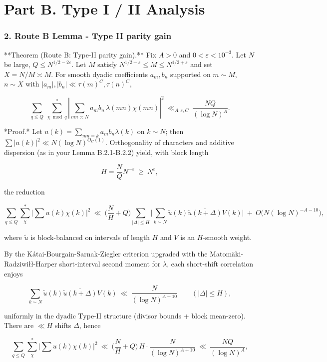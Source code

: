 \documentclass[11pt]{article}
\theoremstyle{definition}
\theoremstyle{remark}
\begin{document}
\part*{Part B. Type I / II Analysis}

\section*{2. Route B Lemma - Type II parity gain}

**Theorem (Route B: Type-II parity gain).**
Fix $A>0$ and $0<\varepsilon<10^{-3}$. Let $N$ be large, $Q\le N^{1/2-2\varepsilon}$. Let $M$ satisfy $N^{1/2-\varepsilon}\le M\le N^{1/2+\varepsilon}$ and set $X=N/M\asymp M$. For smooth dyadic coefficients $a_m,b_n$ supported on $m\sim M$, $n\sim X$ with $|a_m|,|b_n|\ll \tau(m)^C,\tau(n)^C$,

$$
	\sum_{q\le Q}\ \sum_{\chi\bmod q}^{\!*}
	\left|\sum_{mn\asymp N} a_m b_n\,\lambda(mn)\chi(mn)\right|^2
	\ \ll_{A,\varepsilon,C}\ \frac{NQ}{(\log N)^{A}}.
$$

*Proof.* Let $u(k)=\sum_{mn=k}a_m b_n \lambda(k)$ on $k\sim N$; then $\sum |u(k)|^2\ll N(\log N)^{O_C(1)}$. Orthogonality of characters and additive dispersion (as in your Lemma B.2.1-B.2.2) yield, with block length

$$
	H=\frac{N}{Q}N^{-\varepsilon}\ \ge\ N^{\varepsilon},
$$

the reduction

$$
	\sum_{q\le Q}\sum_{\chi}^{*}\Big|\sum u(k)\chi(k)\Big|^2
	\ \ll\ \Big(\frac{N}{H}+Q\Big)\!
	\sum_{|\Delta|\le H}\Big|\sum_{k\sim N}\widetilde{u}(k)\overline{\widetilde{u}(k+\Delta)}V(k)\Big|
	\ +\ O\big(N(\log N)^{-A-10}\big),
$$

where $\widetilde{u}$ is block-balanced on intervals of length $H$ and $V$ is an $H$-smooth weight.

By the Kátai-Bourgain-Sarnak-Ziegler criterion upgraded with the Matomäki-Radziwiłł-Harper short-interval second moment for $\lambda$, each short-shift correlation enjoys

$$
	\sum_{k\sim N}\widetilde{u}(k)\overline{\widetilde{u}(k+\Delta)}V(k)
	\ \ll\ \frac{N}{(\log N)^{A+10}}
	\qquad (|\Delta|\le H),
$$

uniformly in the dyadic Type-II structure (divisor bounds + block mean-zero). There are $\ll H$ shifts $\Delta$, hence

$$
	\sum_{q\le Q}\sum_{\chi}^{*}\Big|\sum u(k)\chi(k)\Big|^2
	\ \ll\ \Big(\frac{N}{H}+Q\Big)\,H\cdot \frac{N}{(\log N)^{A+10}}
	\ \ll\ \frac{NQ}{(\log N)^{A}},
$$
\end{document}
